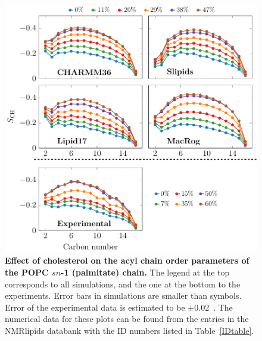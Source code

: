\documentclass[journal=jpcbfk,manuscript=suppinfo]{achemso}
\begin{document}
\begin{figure}[htb!]
    \centering
    \includegraphics[width=0.9\linewidth]{../FIGS/palmitate.pdf}
    \caption{\label{SIfig:palmitate}%
     \textbf{Effect of cholesterol on the acyl chain order parameters of the POPC $sn$-1 (palmitate) chain.}
     The legend at the top corresponds to all simulations, and the one at the bottom to the experiments. Error bars in simulations are smaller than symbols. Error of the experimental data is estimated to be $\pm$0.02~\cite{Ollila16}. The numerical data for these plots can be found from the entries in the NMRlipids databank with the ID numbers listed in Table~\ref{IDtable}.
    }
\end{figure}
\end{document}
